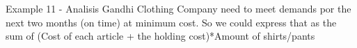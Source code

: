 \begin{frame}{Example 11 - Analisis}
Gandhi Clothing Company need to meet demands por the next two months
(on time) at minimum cost. So we could express that as the sum of
(Cost of each article + the holding cost)*Amount of shirts/pants
\end{frame}
